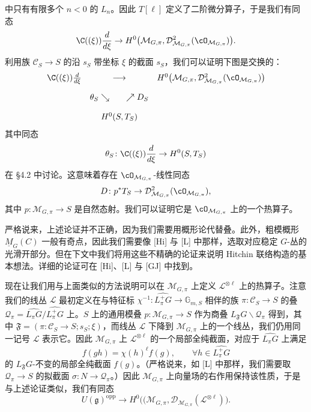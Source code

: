 
中只有有限多个 $n<0$ 的 $L_n$。因此 $T[\ell]$ 定义了二阶微分算子，于是我们有同态
\[
 \C((\xi))\frac{d}{d\xi}\to H^0\bigl(\mathcal M_{G,\pi},\mathcal D_{\mathcal M_{G,\pi}}^2(\cO_{\mathcal M_{G,\pi}})\bigr).
\]
利用族 $\mathcal C_S\to S$ 的沿 $s_S$ 带坐标 $\xi$ 的截面 $s_S$，我们可以证明下图是交换的：
\[
 \begin{array}{ccc}
 \C((\xi))\frac{d}{d\xi} & \longrightarrow & H^0\bigl(\mathcal M_{G,\pi},\mathcal D_{\mathcal M_{G,\pi}}^2(\cO_{\mathcal M_{G,\pi}})\bigr)\\[4mm]
 & \theta_S\searrow\qquad\nearrow D_S & \\[4mm]
 & H^0(S,T_S) &
 \end{array}
\]
其中同态
\[
 \theta_S\colon\C((\xi))\frac{d}{d\xi}\to H^0(S,T_S)
\]
在 §4.2 中讨论。这意味着存在 $\cO_{\mathcal M_{G,\pi}}$-线性同态
\[
 D\colon p^*T_S\to\mathcal D_{\mathcal M_{G,\pi}}^2(\cO_{\mathcal M_{G,\pi}}),
\]
其中 $p\colon\mathcal M_{G,\pi}\to S$ 是自然态射。我们可以证明它是 $\cO_{\mathcal M_{G,\pi}}$ 上的一个热算子。


严格说来，上述论证并不正确，因为我们需要用概形论代替叠。此外，粗模概形 $\underline M_G(C)$ 一般有奇点，因此我们需要像 [Hi] 与 [L] 中那样，选取对应稳定 $G$-丛的光滑开部分。但在下文中我们将用这些不精确的论证来说明 Hitchin 联络构造的基本想法。详细的论证可在 [Hi]、[L] 与 [GJ] 中找到。


现在让我们用与上面类似的方法说明可以在 $\mathcal M_{G,\pi}$ 上定义 $\mathcal L^{\otimes\ell}$ 上的热算子。注意我们的线丛 $\mathcal L$ 最初定义在与特征标 $\chi^{-1}\colon\widehat{L_\pi^+G}\to\mathbb G_{m,S}$ 相伴的族 $\pi\colon\mathcal C_S\to S$ 的叠 $\mathcal Q_\pi=\widehat{L_\pi G}/\widehat{L_\pi^+G}$ 上。$S$ 上的通用模叠 $p\colon\mathcal M_{G,\pi}\to S$ 作为商叠 $L_{\mathfrak F}G\backslash\mathcal Q_\pi$ 得到，其中 $\mathfrak F=(\pi\colon\mathcal C_S\to S;s_S;\xi)$，而线丛 $\mathcal L$ 下降到 $\mathcal M_{G,\pi}$ 上的一个线丛，我们仍用同一记号 $\mathcal L$ 表示它。因此 $\mathcal M_{G,\pi}$ 上 $\mathcal L^{\otimes\ell}$ 的一个局部全纯截面，对应于 $\widehat{L_\pi G}$ 上满足
\[
 f(gh)=\chi(h)^\ell f(g),\qquad \forall h\in\widehat{L_\pi^+G}
\]
的 $L_{\mathfrak F}G$-不变的局部全纯截面 $f(g)$。（严格说来，如 [L] 中那样，我们需要取 $\mathcal Q_\pi\to S$ 的拟截面 $\sigma\colon N\to\mathcal Q_\pi$。）因此 $\mathcal M_{G,\pi}$ 上向量场的右作用保持该性质，于是与上述论证类似，我们有同态
\[
 U(\mathfrak g)^{\mathrm{opp}}\to H^0\bigl((\mathcal M_{G,\pi},\mathcal D_{\mathcal M_{G,\pi}}(\mathcal L^{\otimes\ell})\bigr).
\]

